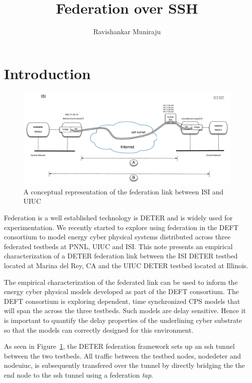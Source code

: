 \documentclass{sig-alternate-10pt} \usepackage{enumerate}
\begin{document}
\title{Federation over SSH}
\author{
Ravishankar Muniraju
}

\maketitle

\section{Introduction}


\begin{figure}
  \begin{center}
    \includegraphics[width=6in]{figures/deter-uiuc-feddmap.pdf} 
    \caption{A conceptual representation of the federation link between ISI and UIUC}
    \label{fig:isi-uiuc}
  \end{center} 
\end{figure}

Federation is a well established technology is DETER and is  widely used 
 for experimentation. 
We recently started to explore using federation in the DEFT 
 consortium to model  energy cyber physical systems
 distributed across three federated testbeds at PNNL, UIUC and ISI. 
This note presents an empirical characterization of a DETER federation link 
between the ISI DETER testbed located at Marina del Rey, CA and the UIUC
DETER testbed located at  Illinois. 

The empirical characterization of the federated link 
 can be used to inform the energy cyber 
physical models developed as part of the DEFT consortium. 
The DEFT consortium is exploring dependent, time synchronized 
 CPS models that will span the across the three testbeds. 
Such models are delay sensitive. 
 Hence it is important to
quantify the delay properties of the underlining cyber substrate so that the
models can correctly designed for this environment.

As seen in Figure~\ref{fig:isi-uiuc}, 
 the DETER federation framework sets up 
an ssh tunnel between the two testbeds.
All traffic between the testbed nodes, nodedeter and nodeuiuc, 
 is subsequently transfered over the tunnel by directly bridging the 
 the end node to the ssh tunnel using a federation \emph{tap}. 
\end{document}
